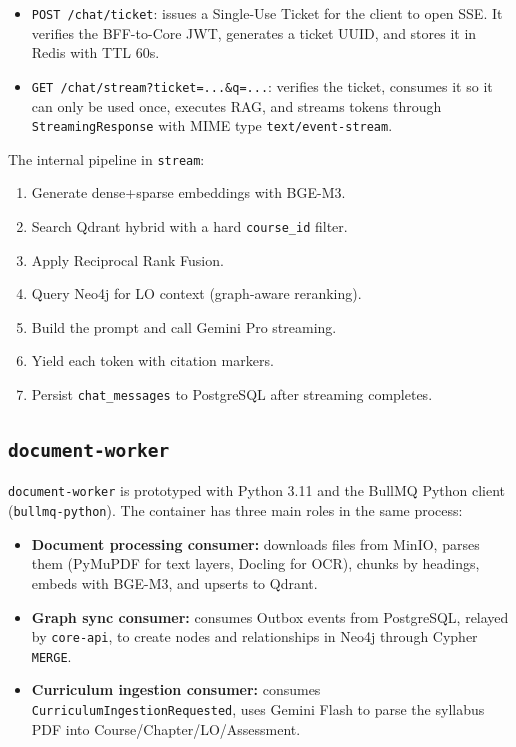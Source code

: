 \begin{itemize}
    \item \texttt{POST /chat/ticket}: issues a Single-Use Ticket for
          the client to open SSE. It verifies the BFF-to-Core JWT,
          generates a ticket UUID, and stores it in Redis with TTL 60s.
    \item \texttt{GET /chat/stream?ticket=...\&q=...}: verifies the
          ticket, consumes it so it can only be used once, executes RAG,
          and streams tokens through \texttt{StreamingResponse} with MIME
          type \texttt{text/event-stream}.
\end{itemize}

The internal pipeline in \texttt{stream}:

\begin{enumerate}
    \item Generate dense+sparse embeddings with BGE-M3.
    \item Search Qdrant hybrid with a hard \texttt{course\_id} filter.
    \item Apply Reciprocal Rank Fusion.
    \item Query Neo4j for LO context (graph-aware reranking).
    \item Build the prompt and call Gemini Pro streaming.
    \item Yield each token with citation markers.
    \item Persist \texttt{chat\_messages} to PostgreSQL after streaming
          completes.
\end{enumerate}

\subsection{\texttt{document-worker}}

\texttt{document-worker} is prototyped with Python 3.11 and the BullMQ
Python client (\texttt{bullmq-python}). The container has three main
roles in the same process:

\begin{itemize}
    \item \textbf{Document processing consumer:} downloads files from
          MinIO, parses them (PyMuPDF for text layers, Docling for OCR),
          chunks by headings, embeds with BGE-M3, and upserts to Qdrant.
    \item \textbf{Graph sync consumer:} consumes Outbox events from
          PostgreSQL, relayed by \texttt{core-api}, to create nodes and
          relationships in Neo4j through Cypher \texttt{MERGE}.
    \item \textbf{Curriculum ingestion consumer:} consumes
          \texttt{CurriculumIngestionRequested}, uses Gemini Flash to
          parse the syllabus PDF into Course/Chapter/LO/Assessment.
\end{itemize}

